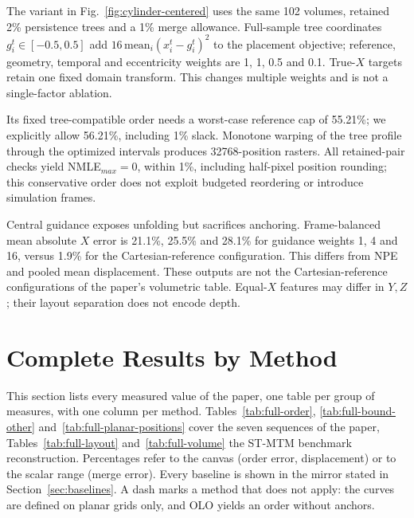 \documentclass[preprint]{vgtc}   %
\begin{document}
The variant in Fig.~\ref{fig:cylinder-centered} uses the same 102 volumes, retained 2\% persistence trees and a 1\% merge allowance. Full-sample tree coordinates $g_i^t\in[-0.5,0.5]$ add $16\,\mathrm{mean}_i(x_i^t-g_i^t)^2$ to the placement objective; reference, geometry, temporal and eccentricity weights are 1, 1, 0.5 and 0.1. True-$X$ targets retain one fixed domain transform. This changes multiple weights and is not a single-factor ablation.

Its fixed tree-compatible order needs a worst-case reference cap of 55.21\%; we explicitly allow 56.21\%, including 1\% slack. Monotone warping of the tree profile through the optimized intervals produces 32768-position rasters. All retained-pair checks yield NMLE$_{max}=0$, within 1\%, including half-pixel position rounding; this conservative order does not exploit budgeted reordering or introduce simulation frames.

Central guidance exposes unfolding but sacrifices anchoring. Frame-balanced mean absolute $X$ error is 21.1\%, 25.5\% and 28.1\% for guidance weights 1, 4 and 16, versus 1.9\% for the Cartesian-reference configuration. This differs from NPE and pooled mean displacement. These outputs are not the Cartesian-reference configurations of the paper's volumetric table. Equal-$X$ features may differ in $Y,Z$; their layout separation does not encode depth.

\section{Complete Results by Method}\label{sec:complete}
This section lists every measured value of the paper, one table per group of measures, with one column per method. Tables~\ref{tab:full-order}, \ref{tab:full-bound-other} and~\ref{tab:full-planar-positions} cover the seven sequences of the paper, Tables~\ref{tab:full-layout} and~\ref{tab:full-volume} the ST-MTM benchmark reconstruction. Percentages refer to the canvas (order error, displacement) or to the scalar range (merge error). Every baseline is shown in the mirror stated in Section~\ref{sec:baselines}. A dash marks a method that does not apply: the curves are defined on planar grids only, and OLO yields an order without anchors.
\end{document}
